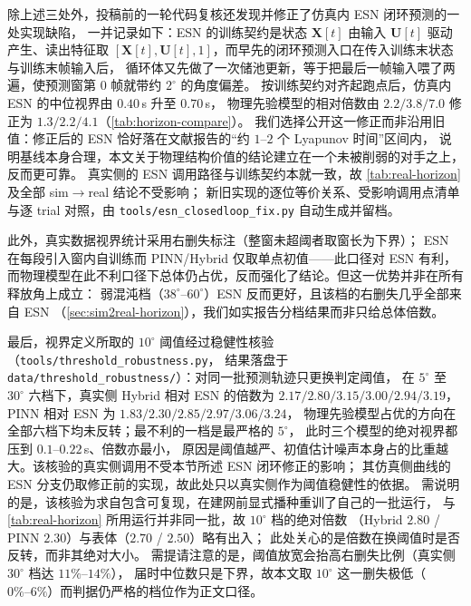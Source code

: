 \documentclass[a4paper,12pt]{ctexart}   %
\begin{document}
\noindent 除上述三处外，投稿前的一轮代码复核还发现并修正了仿真内 ESN 闭环预测的一处实现缺陷，
一并记录如下：ESN 的训练契约是状态 $\bm{X}[t]$ 由输入 $\bm{U}[t]$ 驱动产生、读出特征取
$[\bm{X}[t], \bm{U}[t], 1]$，而早先的闭环预测入口在传入训练末状态与训练末帧输入后，
循环体又先做了一次储池更新，等于把最后一帧输入喂了两遍，使预测窗第 $0$ 帧就带约 $2^\circ$ 的角度偏差。
按训练契约对齐起跑点后，仿真内 ESN 的中位视界由 $0.40$\,s 升至 $0.70$\,s，
物理先验模型的相对倍数由 $2.2/3.8/7.0$ 修正为 $1.3/2.2/4.1$（\cref{tab:horizon-compare}）。
我们选择公开这一修正而非沿用旧值：修正后的 ESN 恰好落在文献报告的“约 $1$--$2$ 个 Lyapunov 时间”区间内，
说明基线本身合理，本文关于物理结构价值的结论建立在一个未被削弱的对手之上，反而更可靠。
真实侧的 ESN 调用路径与训练契约本就一致，故 \cref{tab:real-horizon} 及全部 sim$\to$real 结论不受影响；
新旧实现的逐位等价关系、受影响调用点清单与逐 trial 对照，由 \texttt{tools/esn\_closedloop\_fix.py} 自动生成并留档。

\noindent 此外，真实数据视界统计采用右删失标注（整窗未超阈者取窗长为下界）；
ESN 在每段引入窗内自训练而 PINN/Hybrid 仅取单点初值——此口径对 ESN 有利，
而物理模型在此不利口径下总体仍占优，反而强化了结论。但这一优势并非在所有释放角上成立：
弱混沌档（$38^\circ$--$60^\circ$）ESN 反而更好，且该档的右删失几乎全部来自 ESN
（\cref{sec:sim2real-horizon}），我们如实报告分档结果而非只给总体倍数。

\noindent 最后，视界定义所取的 $10^\circ$ 阈值经过稳健性核验（\texttt{tools/threshold\_robustness.py}，
结果落盘于 \texttt{data/threshold\_robustness/}）：对同一批预测轨迹只更换判定阈值，
在 $5^\circ$ 至 $30^\circ$ 六档下，真实侧 Hybrid 相对 ESN 的倍数为
$2.17 / 2.80 / 3.15 / 3.00 / 2.94 / 3.19$，PINN 相对 ESN 为 $1.83 / 2.30 / 2.85 / 2.97 / 3.06 / 3.24$，
物理先验模型占优的方向在全部六档下均未反转；最不利的一档是最严格的 $5^\circ$，
此时三个模型的绝对视界都压到 $0.1\text{--}0.22$\,s、倍数亦最小，
原因是阈值越严、初值估计噪声本身占的比重越大。该核验的真实侧调用不受本节所述 ESN 闭环修正的影响；
其仿真侧曲线的 ESN 分支仍取修正前的实现，故此处只以真实侧作为阈值稳健性的依据。
需说明的是，该核验为求自包含可复现，在建网前显式播种重训了自己的一批运行，
与 \cref{tab:real-horizon} 所用运行并非同一批，故 $10^\circ$ 档的绝对倍数
（Hybrid $2.80$ / PINN $2.30$）与表体（$2.70$ / $2.50$）略有出入；
此处关心的是倍数在换阈值时是否反转，而非其绝对大小。
需提请注意的是，阈值放宽会抬高右删失比例（真实侧 $30^\circ$ 档达 $11\%\text{--}14\%$），
届时中位数只是下界，故本文取 $10^\circ$ 这一删失极低（$0\%\text{--}6\%$）而判据仍严格的档位作为正文口径。
\end{document}
